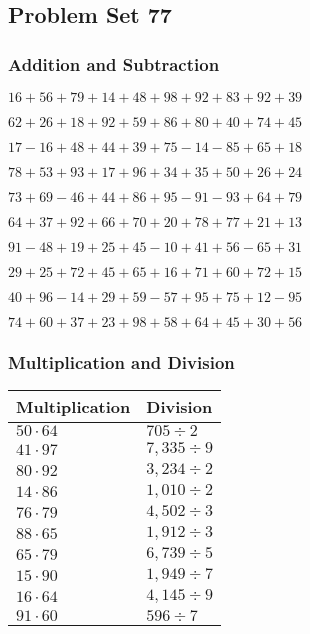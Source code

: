 \hypertarget{problem-set-77}{%
\subsection{Problem Set 77}\label{problem-set-77}}

\hypertarget{addition-and-subtraction}{%
\subsubsection{Addition and
Subtraction}\label{addition-and-subtraction}}

\(16+56+79+14+48+98+92+83+92+39\)

\(62+26+18+92+59+86+80+40+74+45\)

\(17-16+48+44+39+75-14-85+65+18\)

\(78+53+93+17+96+34+35+50+26+24\)

\(73+69-46+44+86+95-91-93+64+79\)

\(64+37+92+66+70+20+78+77+21+13\)

\(91-48+19+25+45-10+41+56-65+31\)

\(29+25+72+45+65+16+71+60+72+15\)

\(40+96-14+29+59-57+95+75+12-95\)

\(74+60+37+23+98+58+64+45+30+56\)

\hypertarget{multiplication-and-division}{%
\subsubsection{Multiplication and
Division}\label{multiplication-and-division}}

\begin{longtable}[]{@{}ll@{}}
\toprule
Multiplication & Division\tabularnewline
\midrule
\endhead
\(50\cdot64\) & \(705÷2\)\tabularnewline
\(41\cdot97\) & \(7,335÷9\)\tabularnewline
\(80\cdot92\) & \(3,234÷2\)\tabularnewline
\(14\cdot86\) & \(1,010÷2\)\tabularnewline
\(76\cdot79\) & \(4,502÷3\)\tabularnewline
\(88\cdot65\) & \(1,912÷3\)\tabularnewline
\(65\cdot79\) & \(6,739÷5\)\tabularnewline
\(15\cdot90\) & \(1,949÷7\)\tabularnewline
\(16\cdot64\) & \(4,145÷9\)\tabularnewline
\(91\cdot60\) & \(596÷7\)\tabularnewline
\bottomrule
\end{longtable}
